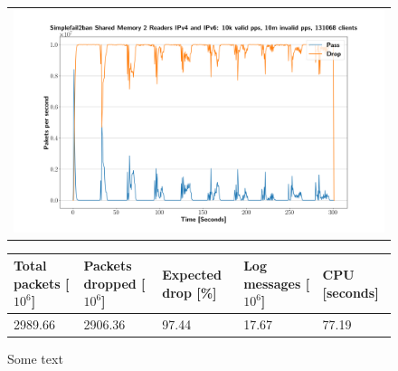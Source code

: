 \begin{figure}[p]
	\label{fig:simplefail2ban:shm:2r}
	\centering
	\scriptsize
	\begin{tabular}{c}
    	\centerline{\includegraphics[width=1.2\textwidth]{images/simplefail2ban_shm_2r_ipv46_v10k_iv10m_c131068.png}}
	\end{tabular}
	\begin{tabular}{lllll}
		\toprule
		\textbf{Total packets [$10^6$]} & \textbf{Packets dropped [$10^6$]} & \textbf{Expected drop [\%]} & \textbf{Log messages [$10^6$]} & \textbf{CPU [seconds]} \\ \midrule 
		2989.66 & 2906.36 & 97.44 & 17.67 & 77.19 \\
		\bottomrule
	\end{tabular}
	\caption[Simplefail2ban Shared Memory 2 Readers]{Some text}
\end{figure}

